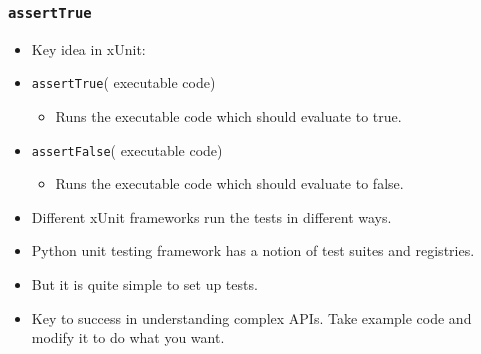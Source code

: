\documentclass{beamer}
\begin{document}
\begin{frame}
  \frametitle{{\tt assertTrue}}
  \begin{itemize}
  \item Key idea in xUnit:
  \item {\tt assertTrue}( executable code)
    \begin{itemize}
    \item  Runs the executable code which should evaluate to true.
    \end{itemize}
  \item {\tt assertFalse}( executable code)

    \begin{itemize}
  \item Runs the executable code which should evaluate to false. 
\end{itemize}
    \end{itemize}
\end{frame}
\begin{frame}
  \begin{itemize}
  \item Different xUnit frameworks run the tests in different
  ways. 
\item Python unit testing framework has a notion of test suites and
  registries.
\item But it is quite simple to set up tests.
\item  Key to success in understanding complex APIs. Take example code
  and modify it to do what you want. 
  \end{itemize}
\end{frame}
\end{document}
